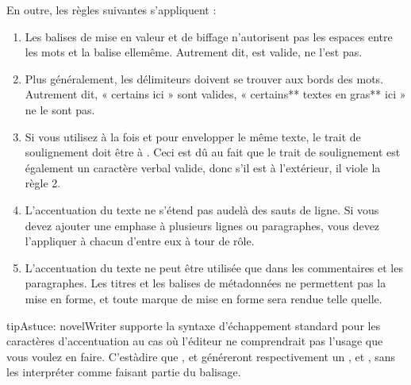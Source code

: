 \documentclass[a4paper,11pt,french]{sphinxmanual}
\begin{document}
\sphinxAtStartPar
En outre, les règles suivantes s’appliquent :
\begin{enumerate}
%
\item {} 
\sphinxAtStartPar
Les balises de mise en valeur et de biffage n’autorisent pas les espaces entre les mots et la balise elle\sphinxhyphen{}même. Autrement dit,  est valide,  ne l’est pas.

\item {} 
\sphinxAtStartPar
Plus généralement, les délimiteurs doivent se trouver aux bords des mots. Autrement dit, « certains  ici » sont valides, « certains** textes en gras** ici » ne le sont pas.

\item {} 
\sphinxAtStartPar
Si vous utilisez à la fois \sphinxcode{\sphinxupquote{**}} et \sphinxcode{\sphinxupquote{\_}} pour envelopper le même texte, le trait de soulignement doit être à . Ceci est dû au fait que le trait de soulignement est également un caractère verbal valide, donc s’il est à l’extérieur, il viole la règle 2.

\item {} 
\sphinxAtStartPar
L’accentuation du texte ne s’étend pas au\sphinxhyphen{}delà des sauts de ligne. Si vous devez ajouter une emphase à plusieurs lignes ou paragraphes, vous devez l’appliquer à chacun d’entre eux à tour de rôle.

\item {} 
\sphinxAtStartPar
L’accentuation du texte ne peut être utilisée que dans les commentaires et les paragraphes. Les titres et les balises de métadonnées ne permettent pas la mise en forme, et toute marque de mise en forme sera rendue telle quelle.

\end{enumerate}

\begin{sphinxadmonition}{tip}{Astuce:}
\sphinxAtStartPar
novelWriter supporte la syntaxe d’échappement standard pour les caractères d’accentuation au cas où l’éditeur ne comprendrait pas l’usage que vous voulez en faire. C’est\sphinxhyphen{}à\sphinxhyphen{}dire que \sphinxcode{\sphinxupquote{\textbackslash{}*}}, \sphinxcode{\sphinxupquote{\textbackslash{}\_}} et \sphinxcode{\sphinxupquote{\textbackslash{}\textasciitilde{}}} généreront respectivement un \sphinxcode{\sphinxupquote{*}}, \sphinxcode{\sphinxupquote{\_}} et \sphinxcode{\sphinxupquote{\textasciitilde{}}}, sans les interpréter comme faisant partie du balisage.
\end{sphinxadmonition}
\end{document}
